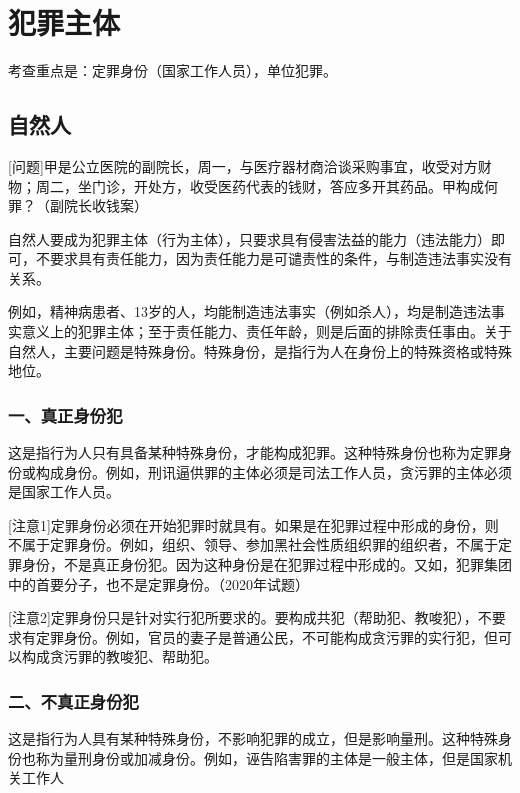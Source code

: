 \chapter{犯罪主体}

\begin{EditionOpeningPanel}
考查重点是：定罪身份（国家工作人员），单位犯罪。
\end{EditionOpeningPanel}

\section{自然人}

[问题]甲是公立医院的副院长，周一，与医疗器材商洽谈采购事宜，收受对方财物；周二，坐门诊，开处方，收受医药代表的钱财，答应多开其药品。甲构成何罪？（副院长收钱案）

自然人要成为犯罪主体（行为主体），只要求具有侵害法益的能力（违法能力）即可，不要求具有责任能力，因为责任能力是可谴责性的条件，与制造违法事实没有关系。

例如，精神病患者、13岁的人，均能制造违法事实（例如杀人），均是制造违法事实意义上的犯罪主体；至于责任能力、责任年龄，则是后面的排除责任事由。关于自然人，主要问题是特殊身份。特殊身份，是指行为人在身份上的特殊资格或特殊地位。

\subsection*{一、真正身份犯}

这是指行为人只有具备某种特殊身份，才能构成犯罪。这种特殊身份也称为定罪身份或构成身份。例如，刑讯逼供罪的主体必须是司法工作人员，贪污罪的主体必须是国家工作人员。

[注意1]定罪身份必须在开始犯罪时就具有。如果是在犯罪过程中形成的身份，则不属于定罪身份。例如，组织、领导、参加黑社会性质组织罪的组织者，不属于定罪身份，不是真正身份犯。因为这种身份是在犯罪过程中形成的。又如，犯罪集团中的首要分子，也不是定罪身份。（2020年试题）

[注意2]定罪身份只是针对实行犯所要求的。要构成共犯（帮助犯、教唆犯），不要求有定罪身份。例如，官员的妻子是普通公民，不可能构成贪污罪的实行犯，但可以构成贪污罪的教唆犯、帮助犯。

\subsection*{二、不真正身份犯}

这是指行为人具有某种特殊身份，不影响犯罪的成立，但是影响量刑。这种特殊身份也称为量刑身份或加减身份。例如，诬告陷害罪的主体是一般主体，但是国家机关工作人

